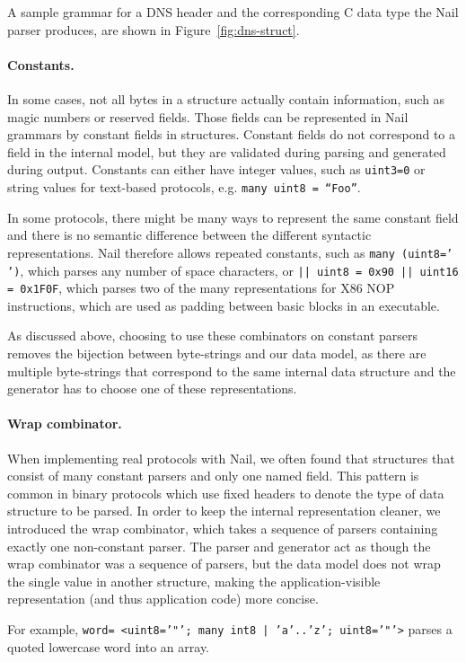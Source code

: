 A sample grammar for a DNS header and the corresponding C data type the Nail parser produces, are
shown in Figure~\ref{fig:dns-struct}.

\paragraph{Constants.}
In some cases, not all bytes in a structure actually contain information, such as magic numbers or
reserved fields. Those fields can be represented in Nail grammars by constant fields in structures.
Constant fields do not correspond to a field in the internal model, but they are validated during
parsing and generated during output.  Constants can either have integer values, such as
\texttt{uint3=0} or string values for text-based protocols, e.g. \texttt{many uint8 = ``Foo''}.

In some protocols, there might be many ways to represent the same constant field
and there is no semantic difference between the different syntactic representations.
Nail therefore allows repeated constants, such as \texttt{many (uint8=' ')}, which parses any number of space characters, or
\texttt{|| uint8 = 0x90 || uint16 = 0x1F0F}, which parses two of the many representations for X86
NOP instructions, which are used as padding between basic blocks in an executable. 

As discussed above, choosing to use these combinators on constant parsers
removes the bijection between byte-strings and our data model, as there are
multiple byte-strings that correspond to the same internal data structure and
the generator has to choose one of these representations.
\paragraph{Wrap combinator.} 
When implementing real protocols with Nail, we often found that
structures that consist of many constant parsers and only one named field. This pattern is
common in binary protocols which use fixed headers to denote the type of data
structure to be parsed.  In order to keep the internal representation cleaner,
we introduced the wrap combinator, which takes a sequence of parsers containing
exactly one non-constant parser. The parser and generator act as though the wrap
combinator was a sequence of parsers, but the data model does not wrap the
single value in another structure, making the application-visible representation
(and thus application code) more concise.


For example, \texttt{word= <uint8='"'; many int8 | 'a'..'z'; uint8='"'>} parses a quoted
lowercase word into an array.

